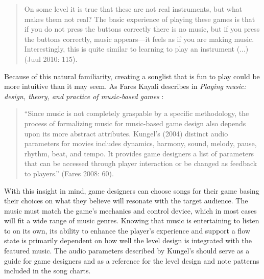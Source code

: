 \begin{quote}
    On some level it is true that these are not real instruments, but what makes them not real? The basic experience of playing these games is that if you do not press the buttons correctly there is no music, but if you press the buttons correctly, music appears—it feels as if you are making music. Interestingly, this is quite similar to learning to play an instrument (...) (Juul 2010: 115).
\end{quote}

Because of this natural familiarity, creating a songlist that is fun to play could be more intuitive than it may seem. As Fares Kayali describes in \textit{Playing music: design, theory, and practice of music-based games} \cite{faresplayingmusic}: 

\begin{quote}
    “Since music is not completely graspable by a specific methodology, the process of formalizing music for music-based game design also depends upon its more abstract attributes. Kungel’s (2004) distinct audio parameters for movies includes dynamics, harmony, sound, melody, pause, rhythm, beat, and tempo. It provides game designers a list of parameters that can be accessed through player interaction or be changed as feedback to players.” (Fares 2008: 60).
\end{quote}

With this insight in mind, game designers can choose songs for their game basing their choices on what they believe will resonate with the target audience. The music must match the game’s mechanics and control device, which in most cases will fit a wide range of music genres. Knowing that music is entertaining to listen to on its own, its ability to enhance the player’s experience and support a flow state is primarily dependent on how well the level design is integrated with the featured music. The audio parameters described by Kungel’s should serve as a guide for game designers and as a reference for the level design and note patterns included in the song charts.

